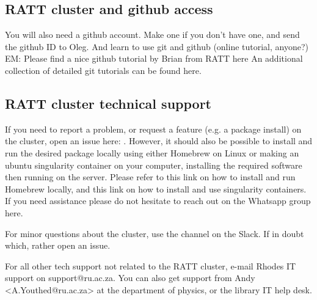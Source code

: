 \subsection{RATT cluster and github access}
You will also need a github account. Make one if you don’t have one, and send the github ID to Oleg. And learn to use git and github (online tutorial, anyone?)
EM: Please find a nice github tutorial by Brian from RATT here
An additional collection of detailed git tutorials can  be found here.

\subsection{RATT cluster technical support}
If you need to report a problem, or request a feature (e.g. a package install) on the cluster, open an issue here:  . However, it should also be possible to install and run the desired package locally using either Homebrew on Linux or making an ubuntu singularity container on your computer, installing the required software then running on the server. Please refer to this link on how to install and run Homebrew locally, and this link on how to install and use singularity containers. If you need assistance please do not hesitate to reach out on the Whatsapp group here.

For minor questions about the cluster, use the  channel on the Slack. If in doubt which, rather open an issue. 

For all other tech support not related to the RATT cluster, e-mail Rhodes IT support on support@ru.ac.za. You can also get support from Andy <A.Youthed@ru.ac.za> at the department of physics, or the library IT help desk. 

